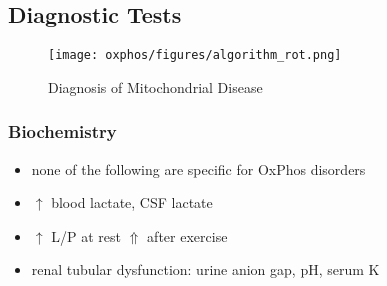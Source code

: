 \documentclass[12pt]{scrartcl}
\begin{document}
\subsection{Diagnostic Tests}
\label{sec:org3437e22}
\begin{figure}[htbp]
\centering
\texttt{[image: oxphos/figures/algorithm\_rot.png]}
\caption{\label{fig:org9fdbad8}Diagnosis of Mitochondrial Disease}
\end{figure}


\subsubsection{Biochemistry}
\label{sec:orgf91aa0e}
\begin{itemize}
\item none of the following are specific for OxPhos disorders
\item \(\uparrow\) blood lactate, CSF lactate
\item \(\uparrow\) L/P at rest \(\Uparrow\) after exercise
\item renal tubular dysfunction: urine anion gap, pH, serum K
\end{itemize}
\end{document}
